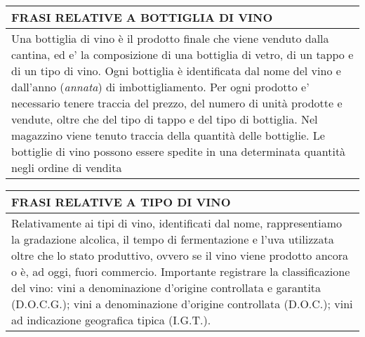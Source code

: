 \begin{center}
	\begin{tabular}{P{16cm}}
		\toprule
		 \textbf {\large {FRASI RELATIVE A BOTTIGLIA DI VINO}}                                                                                                                                                                                                                                                                                                                                                                                                                                                                                                     \\
		\midrule
		Una bottiglia di vino è il prodotto finale che viene venduto dalla cantina, ed e' la composizione di una bottiglia di vetro, di un tappo e di un tipo di vino. Ogni bottiglia è identificata dal nome del vino e dall'anno (\emph{annata}) di imbottigliamento. Per ogni prodotto e' necessario tenere traccia del prezzo, del numero di unità prodotte e vendute, oltre che del tipo di tappo e del tipo di bottiglia. Nel magazzino viene tenuto traccia della quantità delle bottiglie. Le bottiglie di vino possono essere spedite in una determinata quantità negli ordine di vendita \\
		\bottomrule
	\end{tabular}

	\vspace{0.5cm}

	\begin{tabular}{P{16cm}}
		\toprule
		 \textbf {\large {FRASI RELATIVE A TIPO DI VINO}}                                                                                                                                                                                                                                                                                                                                                                                          \\
		\midrule
		Relativamente ai tipi di vino, identificati dal nome, rappresentiamo la gradazione alcolica, il tempo di fermentazione e l'uva utilizzata oltre che lo stato produttivo, ovvero se il vino viene prodotto ancora o è, ad oggi, fuori commercio. Importante registrare la classificazione del vino: vini a denominazione d'origine controllata e garantita (D.O.C.G.); vini a denominazione d'origine controllata (D.O.C.); vini ad indicazione geografica tipica (I.G.T.). \\
		\bottomrule
	\end{tabular}


\end{center}
